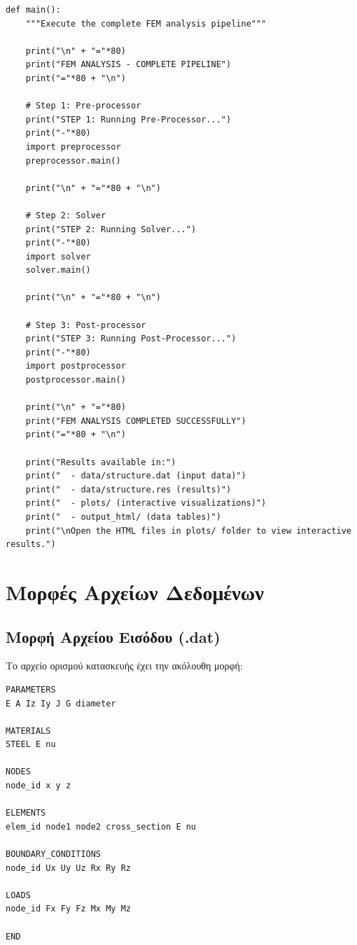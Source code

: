 \documentclass[12pt,a4paper]{article}
\begin{document}
\begin{lstlisting}[caption={Πλήρης Διαδικασία Ανάλυσης FEM}]
def main():
    """Execute the complete FEM analysis pipeline"""
    
    print("\n" + "="*80)
    print("FEM ANALYSIS - COMPLETE PIPELINE")
    print("="*80 + "\n")
    
    # Step 1: Pre-processor
    print("STEP 1: Running Pre-Processor...")
    print("-"*80)
    import preprocessor
    preprocessor.main()
    
    print("\n" + "="*80 + "\n")
    
    # Step 2: Solver
    print("STEP 2: Running Solver...")
    print("-"*80)
    import solver
    solver.main()
    
    print("\n" + "="*80 + "\n")
    
    # Step 3: Post-processor
    print("STEP 3: Running Post-Processor...")
    print("-"*80)
    import postprocessor
    postprocessor.main()
    
    print("\n" + "="*80)
    print("FEM ANALYSIS COMPLETED SUCCESSFULLY")
    print("="*80 + "\n")
    
    print("Results available in:")
    print("  - data/structure.dat (input data)")
    print("  - data/structure.res (results)")
    print("  - plots/ (interactive visualizations)")
    print("  - output_html/ (data tables)")
    print("\nOpen the HTML files in plots/ folder to view interactive results.")
\end{lstlisting}

\section{Μορφές Αρχείων Δεδομένων}

\subsection{Μορφή Αρχείου Εισόδου (.dat)}

Το αρχείο ορισμού κατασκευής έχει την ακόλουθη μορφή:

\begin{verbatim}
PARAMETERS
E A Iz Iy J G diameter

MATERIALS
STEEL E nu

NODES
node_id x y z

ELEMENTS
elem_id node1 node2 cross_section E nu

BOUNDARY_CONDITIONS
node_id Ux Uy Uz Rx Ry Rz

LOADS
node_id Fx Fy Fz Mx My Mz

END
\end{verbatim}
\end{document}
